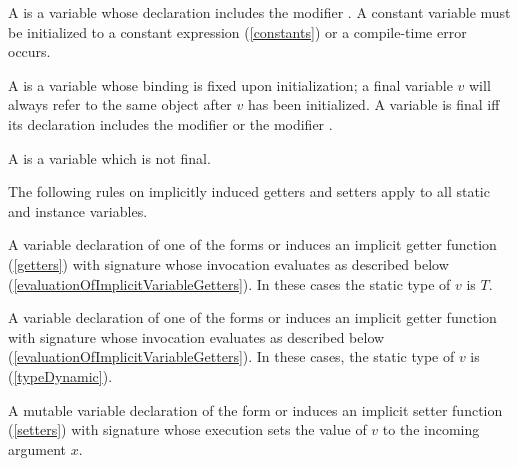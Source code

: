 \documentclass[makeidx]{article}
\begin{document}
\LMHash{}%
A 
is a variable whose declaration includes the modifier \CONST{}.
A constant variable must be initialized to a constant expression (\ref{constants}) or a compile-time error occurs.

\LMHash{}%
A 
is a variable whose binding is fixed upon initialization;
a final variable $v$ will always refer to the same object after $v$ has been initialized.
A variable is final if{}f its declaration includes the modifier \FINAL{} or the modifier \CONST{}.

\LMHash{}%
A 
is a variable which is not final.


\LMHash{}%
The following rules on implicitly induced getters and setters
apply to all static and instance variables.

\LMHash{}%
A variable declaration of one of the forms
or 
induces an implicit getter function (\ref{getters}) with signature
whose invocation evaluates as described below
(\ref{evaluationOfImplicitVariableGetters}).
In these cases the static type of $v$ is $T$.

\LMHash{}%
A variable declaration of one of the forms
or 
induces an implicit getter function with signature
whose invocation evaluates as described below
(\ref{evaluationOfImplicitVariableGetters}).
In these cases, the static type of $v$ is \DYNAMIC{}
(\ref{typeDynamic}).

\LMHash{}%
A mutable variable declaration of the form
or 
induces an implicit setter function (\ref{setters}) with signature
whose execution sets the value of $v$ to the incoming argument $x$.
\end{document}
